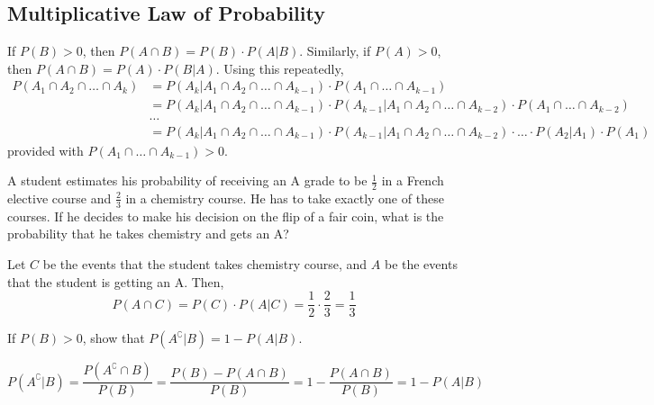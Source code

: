 \subsection{Multiplicative Law of Probability}
If $P(B) > 0$, then $P(A \cap B) = P(B) \cdot P(A \vert B)$. Similarly, if
$P(A) > 0$, then $P(A \cap B) = P(A) \cdot P(B \vert A)$. Using this
repeatedly,
\begin{align*}
    P(A_1 \cap A_2 \cap \dots \cap A_k) 
    &= P(A_k \vert A_1 \cap A_2 \cap \dots \cap A_{k-1}) \cdot
       P(A_1 \cap \dots \cap A_{k-1})                                        \\
    &= P(A_k \vert A_1 \cap A_2 \cap \dots \cap A_{k-1}) \cdot
       P(A_{k-1} \vert A_1 \cap A_2 \cap \dots \cap A_{k-2}) \cdot
       P(A_1 \cap \dots \cap A_{k-2})                                        \\
    &\dots                                                                   \\
    &= P(A_k \vert A_1 \cap A_2 \cap \dots \cap A_{k-1}) \cdot
       P(A_{k-1} \vert A_1 \cap A_2 \cap \dots \cap A_{k-2}) \cdot
       \dots \cdot
       P(A_2 \vert A_1) \cdot
       P(A_1)
\end{align*}
provided with $P(A_1 \cap \dots \cap A_{k-1}) > 0$.

\begin{example}
    A student estimates his probability of receiving an A grade to be
$\frac{1}{2}$ in a French elective course and $\frac{2}{3}$ in a chemistry
course. He has to take exactly one of these courses. If he decides to make his 
decision on the flip of a fair coin, what is the probability that he takes
chemistry and gets an A?
\end{example}
\begin{solution}
    Let $C$ be the events that the student takes chemistry course, and $A$ be
the events that the student is getting an A. Then, 
\begin{equation*}
    P(A \cap C) = P(C) \cdot P(A \vert C)
                = \frac{1}{2} \cdot \frac{2}{3}
                = \frac{1}{3}
\end{equation*}
\end{solution}

\begin{example}
    If $P(B) > 0$, show that $P(A^\complement \vert B) = 1 - P(A \vert B)$.
\end{example}
\begin{solution}
    \begin{equation*}
        P(A^\complement \vert B) 
        = \frac{P(A^\complement \cap B)}{P(B)}                              
        = \frac{P(B) - P(A \cap B)}{P(B)}                                   
        = 1 - \frac{P(A \cap B)}{P(B)}                                      
        = 1 - P(A \vert B)
    \end{equation*}
\end{solution}